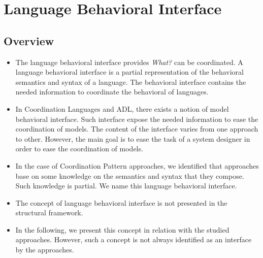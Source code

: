 \section{Language Behavioral Interface}
	\subsection{Overview}
	\begin{itemize}
		\item The language behavioral interface provides \emph{What?} can be coordinated. A language behavioral interface is a partial representation of the behavioral semantics and syntax of a language. The behavioral interface contains the needed information to coordinate the behavioral of languages. 
		\item In Coordination Languages and ADL, there exists a notion of model behavioral interface. Such interface expose the needed information to ease the coordination of models. The content of the interface varies from one approach to other. However, the main goal is to ease the task of a system designer in order to ease the coordination of models.  
		\item In the case of Coordination Pattern approaches, we identified that approaches base on some knowledge on the semantics and syntax that they compose. Such knowledge is partial. We name this language behavioral interface. 
		\item The concept of language behavioral interface is not presented in the structural framework. 
		\item In the following, we present this concept in relation with the studied approaches. However, such a concept is not always identified as an interface by the approaches.   
	\end{itemize}

